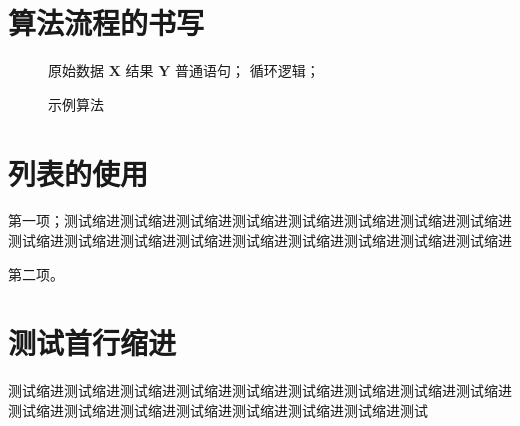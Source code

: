 \section{算法流程的书写}

\begin{figure}
    \centering
    \begin{minipage}{0.75\linewidth}
        \begin{algorithm}[H]
            \caption{示例算法}
            \label{alg-1}
            \begin{algorithmic}[1]
                \Require 原始数据 $\mathbf{X}$
                \Ensure 结果 $\mathbf{Y}$
                \State 普通语句；
                    \State 循环逻辑；
                \EndFor
            \end{algorithmic}
        \end{algorithm}
    \end{minipage}
\end{figure}

\section{列表的使用}

\begin{asparaenum}[（1）]
    \item 第一项；测试缩进测试缩进测试缩进测试缩进测试缩进测试缩进测试缩进测试缩进测试缩进测试缩进测试缩进测试缩进测试缩进测试缩进测试缩进测试缩进测试缩进
    \item 第二项。
\end{asparaenum}

\section{测试首行缩进}

测试缩进测试缩进测试缩进测试缩进测试缩进测试缩进测试缩进测试缩进测试缩进测试缩进测试缩进测试缩进测试缩进测试缩进测试缩进测试缩进测试


\let\cleardoublepage\clearpage



